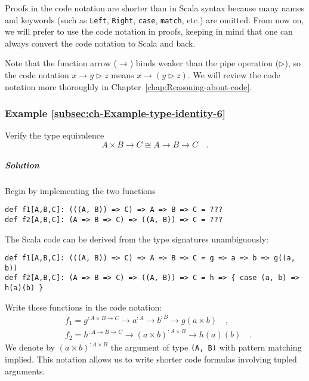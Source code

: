Proofs in the code notation are shorter than in Scala syntax because
many names and keywords (such as \lstinline!Left!, \lstinline!Right!,
\lstinline!case!, \lstinline!match!, etc.) are omitted. From now
on, we will prefer to use the code notation in proofs, keeping in
mind that one can always convert the code notation to Scala and back.

Note that the function arrow ($\rightarrow$) binds weaker than the
pipe operation ($\triangleright$), so the code notation $x\rightarrow y\triangleright z$
means $x\rightarrow(y\triangleright z)$. We will review the code
notation more thoroughly in Chapter~\ref{chap:Reasoning-about-code}.

\subsubsection{Example \label{subsec:ch-Example-type-identity-6}\ref{subsec:ch-Example-type-identity-6}}

Verify the type equivalence 
\[
A\times B\rightarrow C\cong A\rightarrow B\rightarrow C\quad.
\]


\subparagraph{Solution}

Begin by implementing the two functions
\begin{lstlisting}
def f1[A,B,C]: (((A, B)) => C) => A => B => C = ???
def f2[A,B,C]: (A => B => C) => ((A, B)) => C = ???
\end{lstlisting}
The Scala code can be derived from the type signatures unambiguously:
\begin{lstlisting}
def f1[A,B,C]: (((A, B)) => C) => A => B => C = g => a => b => g((a, b))
def f2[A,B,C]: (A => B => C) => ((A, B)) => C = h => { case (a, b) => h(a)(b) }
\end{lstlisting}
Write these functions in the code notation:
\begin{align*}
 & f_{1}=g^{:A\times B\rightarrow C}\rightarrow a^{:A}\rightarrow b^{:B}\rightarrow g(a\times b)\quad,\\
 & f_{2}=h^{:A\rightarrow B\rightarrow C}\rightarrow\left(a\times b\right)^{:A\times B}\rightarrow h(a)(b)\quad.
\end{align*}
We denote by $\left(a\times b\right)^{:A\times B}$ the argument of
type \lstinline!(A, B)! with pattern matching implied. This notation
allows us to write shorter code formulas involving tupled arguments.

